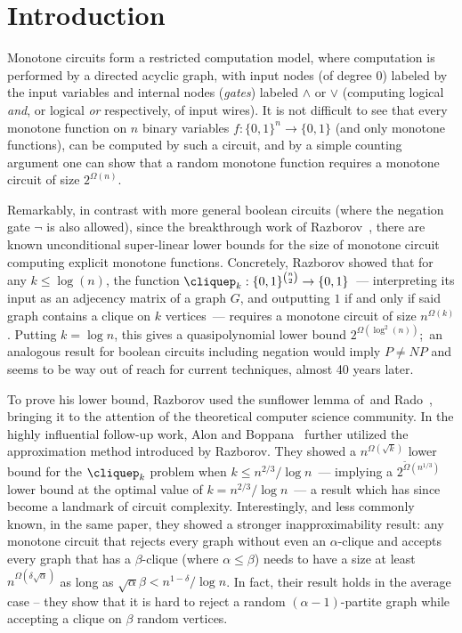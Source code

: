 \section{Introduction}
Monotone circuits form a restricted computation model, where computation is performed by a directed acyclic graph, with input nodes (of degree $0$) labeled by the input variables and internal nodes (\emph{gates}) labeled $\land$ or $\lor$ (computing logical \emph{and}, or logical \emph{or} respectively, of input wires). It is not difficult to see that every monotone function on $n$ binary variables $f:\{0, 1\}^n \to \{0, 1\}$ (and only monotone functions), can be computed by such a circuit, and by a simple counting argument one can show that a random monotone function requires a monotone circuit of size $2^{\Omega(n)}$. 

Remarkably, in contrast with more general boolean circuits (where the negation gate $\lnot$ is also allowed), since the breakthrough work of Razborov~\cite{razborov1985lower}, there are known unconditional super-linear lower bounds for the size of monotone circuit computing explicit monotone functions. Concretely, Razborov showed that for any $k \leq \log(n)$, the function $\cliquep_k : \{0,1\}^{\binom{n}{2}} \to \{0,1\}$~--- interpreting its input as an adjecency matrix of a graph $G$, and outputting $1$ if and only if said graph contains a clique on $k$ vertices~--- requires a monotone circuit of size $n^{\Omega(k)}$. Putting $k = \log n$, this gives a quasipolynomial lower bound $2^{\Omega(\log^2(n))}$;~an analogous result for boolean circuits including negation would imply $P \not=NP$ and seems to be way out of reach for current techniques, almost 40 years later.

To prove his lower bound, Razborov used the sunflower lemma of~\Erdos and Rado~\cite{erdos60}, bringing it to the attention of the theoretical computer science community. In the highly influential follow-up work, Alon and Boppana~\cite{alon87} further utilized the approximation method introduced by Razborov. They showed a $n^{\Omega(\sqrt{k})}$ lower bound for the $\cliquep_k$ problem when $k \leq n^{2/3}/\log n$~--- implying a $2^{\tilde{\Omega}(n^{1/3})}$ lower bound at the optimal value of $k=n^{2/3} / \log n$~--- a result which has since become a landmark of circuit complexity. Interestingly, and less commonly known, in the same paper, they showed a stronger inapproximability result: any monotone circuit that rejects every graph without even an $\alpha$-clique and accepts every graph that has a $\beta$-clique (where $\alpha \leq \beta$) needs to have a size at least $n^{\Omega(\delta \sqrt{\alpha})}$ as long as $\sqrt{\alpha} \beta < n^{1-\delta}/\log n$. In fact, their result holds in the average case -- they show that it is hard to reject a random $(\alpha-1)$-partite graph while accepting a clique on $\beta$ random vertices.

